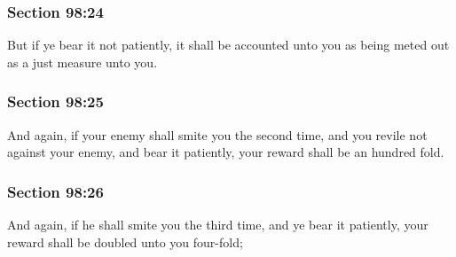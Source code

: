 	\subsubsection{Section 98:24} %
		\label{DC98-24}

		But if ye bear it not patiently, it shall be accounted unto you as being meted out as a just measure unto you.


	\subsubsection{Section 98:25} %
		\label{DC98-25}

		And again, if your enemy shall smite you the second time, and you revile not against your enemy, and bear it patiently, your reward shall be an hundred fold.


	\subsubsection{Section 98:26} %
		\label{DC98-26}

		And again, if he shall smite you the third time, and ye bear it patiently, your reward shall be doubled unto you four-fold;


